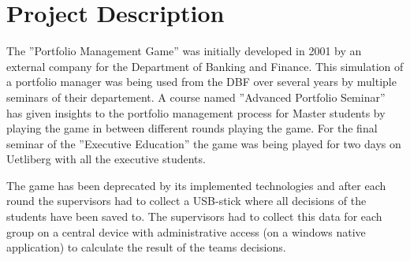 \section{Project Description}
The ''Portfolio Management Game'' was initially developed in 2001 by an external company for the Department of Banking and Finance. This simulation of a portfolio manager was being used from the DBF over several years by multiple seminars of their departement. A course named ''Advanced Portfolio Seminar'' has given insights to the portfolio management process for Master students by playing the game in between different rounds playing the game. For the final seminar of the ''Executive Education'' the game was being played for two days on Uetliberg with all the executive students.

The game has been deprecated by its implemented technologies and after each round the supervisors had to collect a USB-stick where all decisions of the students have been saved to. The supervisors had to collect this data for each group on a central device with administrative access (on a windows native application) to calculate the result of the teams decisions.

